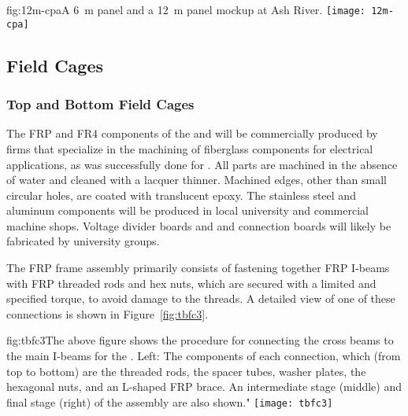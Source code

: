 \begin{dunefigure}{fig:12m-cpa}{A \SI{6}{\m}   panel and a \SI{12}{\m}  panel mockup at Ash River.}
\texttt{[image: 12m-cpa]}
\end{dunefigure}

\subsection{Field Cages}
\label{sec:fdsp-hv-prod-fc}


\subsubsection{Top and Bottom Field Cages}

The FRP and FR4 components of the   and  will be commercially produced by firms that specialize in the machining of fiberglass components for electrical applications, as was successfully done for . All parts are machined in the absence of water and cleaned with a lacquer thinner. Machined edges, other than small circular holes, are coated with translucent epoxy. The stainless steel and aluminum components will be produced in local university and commercial machine shops. Voltage divider boards and  and  connection boards will likely be fabricated by university groups.

The FRP frame assembly primarily consists of fastening together FRP I-beams with FRP threaded rods and hex nuts, which are secured with a limited and specified torque, to avoid damage to the threads. A detailed view of one of these connections is shown in Figure~\ref{fig:tbfc3}.

\begin{dunefigure}{fig:tbfc3}{The above figure shows the procedure for connecting the cross beams to the main I-beams for the . Left: The components of each connection, which (from top to bottom) are the threaded rods, the spacer tubes, washer plates, the hexagonal nuts, and an L-shaped FRP brace. An intermediate stage (middle) and final stage (right) of the assembly are also shown."}
\texttt{[image: tbfc3]}
\end{dunefigure}

